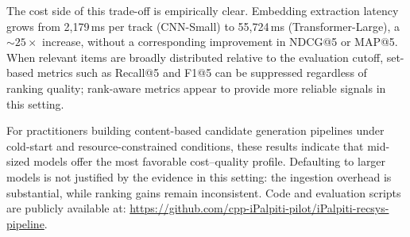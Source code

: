 \documentclass{CPP}
\begin{document}
The cost side of this trade-off is empirically clear. Embedding extraction latency grows from 2{,}179\,ms per track (CNN-Small) to 55{,}724\,ms (Transformer-Large), a ${\sim}25{\times}$ increase, without a corresponding improvement in NDCG@5 or MAP@5. When relevant items are broadly distributed relative to the evaluation cutoff, set-based metrics such as Recall@5 and F1@5 can be suppressed regardless of ranking quality; rank-aware metrics appear to provide more reliable signals in this setting.

For practitioners building content-based candidate generation pipelines under cold-start and resource-constrained conditions, these results indicate that mid-sized models offer the most favorable cost--quality profile. Defaulting to larger models is not justified by the evidence in this setting: the ingestion overhead is substantial, while ranking gains remain inconsistent. Code and evaluation scripts are publicly available at: \url{https://github.com/cpp-iPalpiti-pilot/iPalpiti-recsys-pipeline}.

\SuppChap


\end{document}
